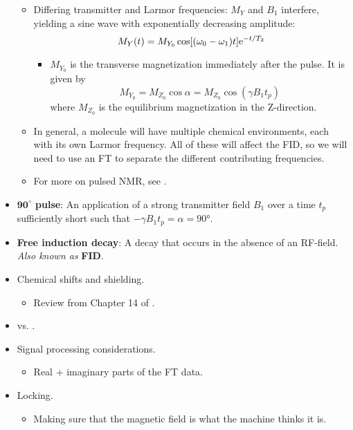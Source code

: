\documentclass[../notes.tex]{subfiles}
\begin{document}
\begin{itemize}
\begin{itemize}
        \item Differing transmitter and Larmor frequencies: $M_Y$ and $B_1$ interfere, yielding a sine wave with exponentially decreasing amplitude:
        \begin{equation*}
            M_Y(t) = M_{Y_0}\cos[(\omega_0-\omega_1)t]\e[-t/T_2]
        \end{equation*}
        \begin{itemize}
            \item $M_{Y_0}$ is the transverse magnetization immediately after the pulse. It is given by
            \begin{equation*}
                M_{Y_0} = M_{Z_0}\cos\alpha = M_{Z_0}\cos(\gamma B_1t_p)
            \end{equation*}
            where $M_{Z_0}$ is the equilibrium magnetization in the Z-direction.
        \end{itemize}
        \item In general, a molecule will have multiple chemical environments, each with its own Larmor frequency. All of these will affect the FID, so we will need to use an FT to separate the different contributing frequencies.
        \item For more on pulsed NMR, see \textcite{bib:Bloch}.
    \end{itemize}
    \item \textbf{$\bm{90^\circ}$ pulse}: An application of a strong transmitter field $B_1$ over a time $t_p$ sufficiently short such that $-\gamma B_1t_p=\alpha=\ang{90}$.
    \item \textbf{Free induction decay}: A decay that occurs in the absence of an RF-field. \emph{Also known as} \textbf{FID}.
    \item Chemical shifts and shielding.
    \begin{itemize}
        \item Review from Chapter 14 of \textcite{bib:McQuarrieSimon}.
    \end{itemize}
    \item {} vs. .
    \item Signal processing considerations.
    \begin{itemize}
        \item Real + imaginary parts of the FT data.
    \end{itemize}
    \item Locking.
    \begin{itemize}
        \item Making sure that the magnetic field is what the machine thinks it is.

\end{itemize}
\end{itemize}
\end{document}
